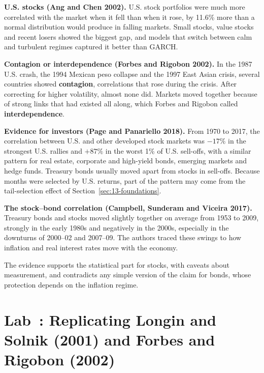 \textbf{U.S. stocks (Ang and Chen 2002).} U.S. stock portfolios were much more correlated with the market when it fell than when it rose, by 11.6\% more than a normal distribution would produce in falling markets. Small stocks, value stocks and recent losers showed the biggest gap, and models that switch between calm and turbulent regimes captured it better than GARCH.

\textbf{Contagion or interdependence (Forbes and Rigobon 2002).} In the 1987 U.S. crash, the 1994 Mexican peso collapse and the 1997 East Asian crisis, several countries showed \textbf{contagion}, correlations that rose during the crisis. After correcting for higher volatility, almost none did. Markets moved together because of strong links that had existed all along, which Forbes and Rigobon called \textbf{interdependence}.

\textbf{Evidence for investors (Page and Panariello 2018).} From 1970 to 2017, the correlation between U.S. and other developed stock markets was $-17\%$ in the strongest U.S. rallies and $+87\%$ in the worst 1\% of U.S. sell-offs, with a similar pattern for real estate, corporate and high-yield bonds, emerging markets and hedge funds. Treasury bonds usually moved apart from stocks in sell-offs. Because months were selected by U.S. returns, part of the pattern may come from the tail-selection effect of Section~\ref{sec:13-foundations}.

\textbf{The stock--bond correlation (Campbell, Sunderam and Viceira 2017).} Treasury bonds and stocks moved slightly together on average from 1953 to 2009, strongly in the early 1980s and negatively in the 2000s, especially in the downturns of 2000--02 and 2007--09. The authors traced these swings to how inflation and real interest rates move with the economy.

The evidence supports the statistical part for stocks, with caveats about measurement, and contradicts any simple version of the claim for bonds, whose protection depends on the inflation regime.

\section{Lab~\thechapter: Replicating Longin and Solnik (2001) and Forbes and Rigobon (2002)}
\label{sec:13-lab}

